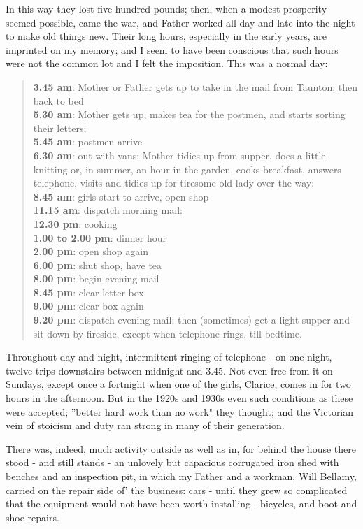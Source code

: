 In this way they lost five hundred pounds; then, when a modest prosperity seemed possible, came the war, and Father worked all day and late into the night to make old things new. Their long hours, especially in the early years, are imprinted on my memory; and I seem to have been conscious that such hours were not the common lot and I felt the imposition. This was a normal day: 

\begin{quote}
\textbf{3.45 am}: Mother or Father gets up to take in the mail from Taunton; then back to bed
\\ \textbf{5.30 am}: Mother gets up, makes tea for the postmen, and starts sorting their letters; 
\\ \textbf{5.45 am}: postmen arrive
\\ \textbf{6.30 am}: out with vans; Mother tidies up from supper, does a little knitting or, in summer, an hour in the garden, cooks breakfast, answers telephone, visits and tidies up for tiresome old lady over the way; 
\\ \textbf{8.45 am}: girls start to arrive, open shop 
\\ \textbf{11.15 am}: dispatch morning mail:
\\ \textbf{12.30 pm}: cooking
\\ \textbf{1.00 to 2.00 pm}: dinner hour
\\ \textbf{2.00 pm}: open shop again
\\ \textbf{6.00 pm}: shut shop, have tea
\\ \textbf{8.00 pm}: begin evening mail
\\ \textbf{8.45 pm}: clear letter box
\\ \textbf{9.00 pm}: clear box again
\\ \textbf{9.20 pm}:  dispatch evening mail; then (sometimes) get a light supper and sit down by fireside, except when telephone rings, till bedtime. 
\end{quote}

Throughout day and night, intermittent ringing of telephone - on one night, twelve trips downstairs between midnight and 3.45. Not even free from it on Sundays, except once a fortnight when one of the girls, Clarice, comes in for two hours in the afternoon.
But in the 1920s and 1930s even such conditions as these were accepted; ''better hard work than no work" they thought; and the Victorian vein of stoicism and duty ran strong in many of their generation.

There was, indeed, much activity outside as well as in, for behind the house there stood - and still stands - an unlovely but capacious corrugated iron shed with benches and an inspection pit, in which my Father and a workman, Will Bellamy, carried on the repair side of' the business: cars - until they grew so complicated that the equipment would not have been worth installing - bicycles, and boot and shoe repairs.

